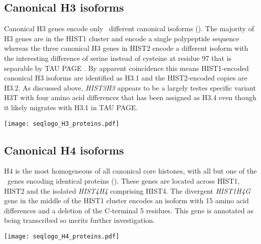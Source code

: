   \subsection{Canonical H3 isoforms}
    Canonical H3 genes encode only \HThreeUniqueProteins{}~different
    canonical isoforms ().
    The majority of H3 genes are in the HIST1 cluster and encode a
    single polypeptide sequence \citep{Ederveen2011}
    whereas the three canonical H3 genes in HIST2 encode a different isoform
    with the interesting difference of serine instead of cysteine at residue 97
    that is separable by TAU PAGE \citep{FranklinZweidler1977}.
    By apparent coincidence this means HIST1-encoded canonical H3 isoforms are
    identified as H3.1 and the HIST2-encoded copies are H3.2.
    As discussed above, \textit{HIST3H3} appears to be 
    a largely testes specific variant H3T
    with four amino acid differences that has been assigned as H3.4 \citep{Talbert2012}
    even though it likely migrates with H3.1 in TAU PAGE.

    \begin{table}
      \caption{%
        Canonical H3 protein isoforms.  Upper panel shows isoforms
        relative to the most common protein sequence.  Lower panel
        shows sequence logo of all isoforms aligned with invariant
        residues in grey.
      }
      \label{tab:H3-consensus}
      
      \texttt{[image: seqlogo\_H3\_proteins.pdf]}
    \end{table}

  \subsection{Canonical H4 isoforms}
    H4 is the most homogeneous of all canonical core histones,
    with all but one of the \HFourCodingGenes{}~genes encoding
    identical proteins ().
    These genes are located across HIST1, HIST2 and the isolated
    \textit{HIST4H4} comprising HIST4.
    The divergent \textit{HIST1H4G} gene in the middle of the HIST1 cluster
    encodes an isoform with 15 amino acid differences and a deletion of the C-terminal 5 residues.
    This gene is annotated as being transcribed so merits further investigation.

    \begin{table}
      \caption{%
        Canonical H4 protein isoforms.  Upper panel shows isoforms
        relative to the most common protein sequence.  Lower panel
        shows sequence logo of all isoforms aligned with invariant
        residues in grey.
      }
      \label{tab:H4-consensus}
      
      \texttt{[image: seqlogo\_H4\_proteins.pdf]}
    \end{table}

